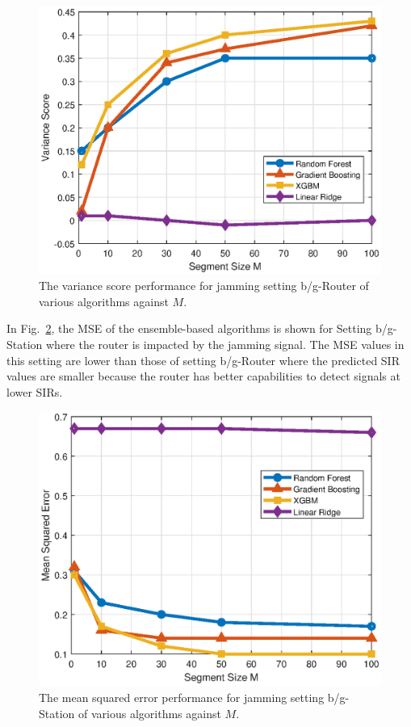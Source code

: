 		\begin{figure}[tbp]
	    \centering
		\includegraphics[width=0.9\columnwidth]{./chapter-ftml/plots/001_R2_M.eps}
		\caption{The variance score performance for jamming setting b/g-Router of various algorithms against $M$.}
		\label{fig:001_R2_M}      
	\end{figure}

In Fig.~\ref{fig:002_MSE_M}, the MSE of the ensemble-based algorithms is shown for Setting b/g-Station where the router is impacted by the jamming signal. The MSE values in this setting are lower than those of setting b/g-Router where the predicted SIR values are smaller because the router has better capabilities to detect signals at lower SIRs.    
	\begin{figure}[tbp]
	    \centering
		\includegraphics[width=0.9\columnwidth]{./chapter-ftml/plots/002_MSE_M.eps}
		\caption{The mean squared error performance for jamming setting b/g-Station of various algorithms against $M$.}
		\label{fig:002_MSE_M}      
	\end{figure}
	
